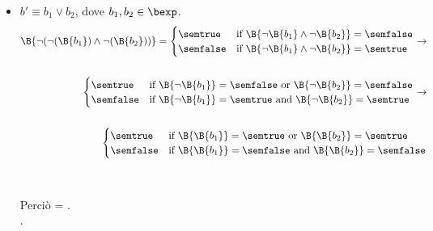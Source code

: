 {\begin{enumerate}[label=(\alph*)]
\begin{itemize}
    \item $ b' \equiv b_1 \lor b_2$, dove $b_1, b_2 \in \bexp$. \\
      \begin{align*}
        \B{\lnot (\lnot (\B{b_1}) \land \lnot (\B{b_2}))} =
        \begin{cases}
        \semtrue &
        \mbox{if} \ \B{\lnot \B{b_1} \land \lnot \B{b_2}} = \semfalse \\
        \semfalse &
        \mbox{if} \ \B{\lnot \B{b_1} \land \lnot \B{b_2}} = \semtrue \\
        \end{cases}
        \rightarrow \\ \\
        \begin{cases}
        \semtrue &
        \mbox{if} \ \B {\lnot \B{b_1}} = \semfalse
                    \mbox{ or }
                    \B {\lnot \B{b_2}} = \semfalse \\
        \semfalse &
        \mbox{if} \ \B{\lnot \B{b_1}} = \semtrue
                    \mbox{ and }
                    \B{\lnot \B{b_2}} = \semtrue \\
        \end{cases}
        \rightarrow \\ \\
        \begin{cases}
        \semtrue &
        \mbox{if} \ \B {\B{b_1}} = \semtrue
                    \mbox{ or }
                    \B {\B{b_2}} = \semtrue \\
        \semfalse &
        \mbox{if} \ \B{\B{b_1}} = \semfalse
                    \mbox{ and }
                    \B{\B{b_2}} = \semfalse \\
        \end{cases}
      \end{align*} \\ \\
      Perciò  =
      . \\.


\end{itemize}
\end{enumerate}}
